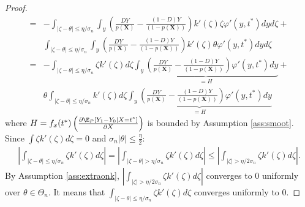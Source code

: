 {\begin{proof}
\begin{align}
            =& -\int_{|\zeta - \theta| \leq \eta/\sigma_n} \int_y \left(\frac{D Y}{p(\textbf{X})} - \frac{(1-D) Y}{(1-p(\textbf{X}))} \right) k'\left(\zeta \right) \zeta \varphi'(y,t^*) dy d\zeta + \\
            & \int_{|\zeta - \theta| \leq \eta/\sigma_n} \int_y \left(\frac{D Y}{p(\textbf{X})} - \frac{(1-D) Y}{(1-p(\textbf{X}))} \right) k'\left(\zeta \right)  \theta \varphi'(y,t^*) dy d\zeta \\
            =& -\int_{|\zeta - \theta| \leq \eta/\sigma_n} \zeta k'\left(\zeta \right) d\zeta \underbrace{\int_y \left(\frac{D Y}{p(\textbf{X})} - \frac{(1-D) Y}{(1-p(\textbf{X}))} \right)  \varphi'(y,t^*) dy}_{=H} + \\
            & \theta \int_{|\zeta - \theta| \leq \eta/\sigma_n} k'\left(\zeta \right) d\zeta \underbrace{\int_y \left(\frac{D Y}{p(\textbf{X})} - \frac{(1-D) Y}{(1-p(\textbf{X}))} \right)  \varphi'(y,t^*) dy}_{=H}
        \end{align}
        where $H=  f_x(t^*) \left(\frac{\partial \E_P\left[Y_1 - Y_0 | X = t^* \right]}{\partial X} \right)$ is bounded by Assumption \ref{ass:smoot}. Since $\int \zeta k'\left(\zeta \right) d\zeta = 0$ and $\sigma_n|\theta| \leq \frac{\eta}{2}$:
        \begin{gather}
            \left| \int_{|\zeta - \theta| \leq \eta/\sigma_n} \zeta k'\left(\zeta \right) d\zeta \right| = \left| \int_{|\zeta - \theta| > \eta/\sigma_n} \zeta k'\left(\zeta \right) d\zeta \right| \leq \left| \int_{|\zeta | > \eta/2\sigma_n} \zeta k'\left(\zeta \right) d\zeta \right|.
        \end{gather}
        By Assumption \ref{ass:extraonk}, $\left| \int_{|\zeta | > \eta/2\sigma_n} \zeta k'\left(\zeta \right) d\zeta \right|$ converges to 0 uniformly over $\theta \in \Theta_n$. It means that $\int_{|\zeta - \theta| \leq \eta/\sigma_n} \zeta k'\left(\zeta \right) d\zeta$ converges uniformly to 0.
        

\end{proof}}

